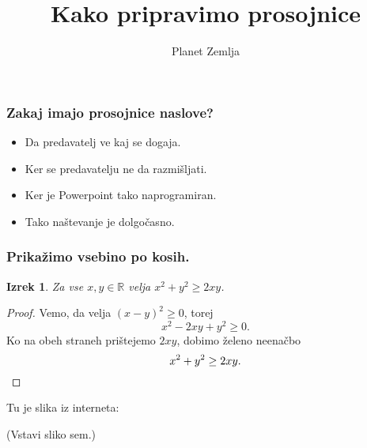 \documentclass[14pt]{beamer}
\newtheorem{izrek}{Izrek}
\begin{document}
\title{Kako pripravimo prosojnice}
\date{Planet Zemlja}

\begin{frame}
  \titlepage

\end{frame}

\begin{frame}
  \frametitle{Zakaj imajo prosojnice naslove?}

  \begin{itemize}
  \item Da predavatelj ve kaj se dogaja.
  \item Ker se predavatelju ne da razmišljati.
  \item Ker je Powerpoint tako naprogramiran.
  \item Tako naštevanje je dolgočasno.
  \end{itemize}


\end{frame}

\begin{frame}
  \frametitle{Prikažimo vsebino po kosih.}

  \begin{izrek}
    Za vse $x, y \in \mathbb{R}$ velja $x^2 + y^2 \geq 2 x y$.
  \end{izrek}

  \pause

  \begin{proof}
    Vemo, da velja $(x - y)^2 \geq 0$, torej
    \begin{equation*}
      x^2 - 2 x y + y^2 \geq 0.
    \end{equation*}
    \pause
    Ko na obeh straneh prištejemo $2 x y$, dobimo želeno neenačbo
    \begin{equation*}
      x^2 + y^2 \geq 2 x y. \qedhere
    \end{equation*}
  \end{proof}

\end{frame}

\begin{frame}
  Tu je slika iz interneta:
  \begin{center}
    (Vstavi sliko sem.)
  \end{center}


\end{frame}
\end{document}
